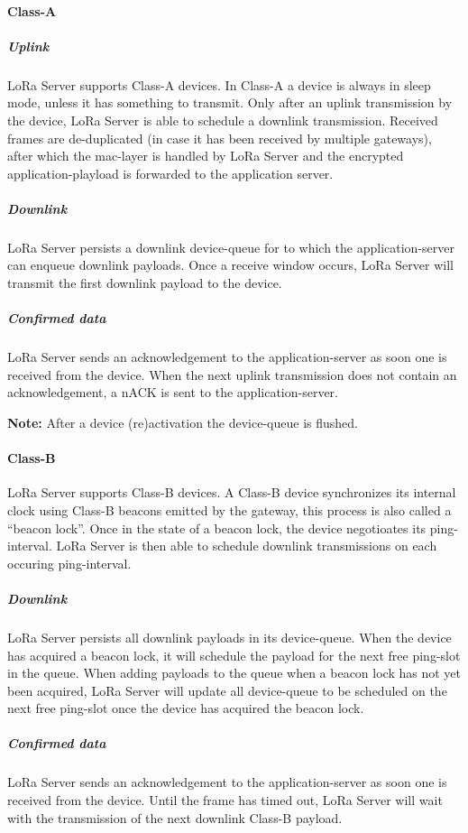 \paragraph{Class-A}

\subparagraph{Uplink}
LoRa Server supports Class-A devices.
In Class-A a device is always in sleep mode,
	unless it has something to transmit.
Only after an uplink transmission by the device,
	LoRa Server is able to schedule a downlink transmission.
Received frames are de-duplicated (in case it has been received by multiple gateways),
	after which the mac-layer is handled by LoRa Server and the encrypted application-playload is forwarded to the application server.

\subparagraph{Downlink}
LoRa Server persists a downlink device-queue for to which the application-server can enqueue downlink payloads.
Once a receive window occurs,
	LoRa Server will transmit the first downlink payload to the device.

\subparagraph{Confirmed data}
LoRa Server sends an acknowledgement to the application-server as soon one is received from the device.
When the next uplink transmission does not contain an acknowledgement,
	a nACK is sent to the application-server.

\textbf{Note:}
	After a device (re)activation the device-queue is flushed.




\paragraph{Class-B}
LoRa Server supports Class-B devices.
A Class-B device synchronizes its internal clock using Class-B beacons emitted by the gateway,
	this process is also called a “beacon lock”.
Once in the state of a beacon lock,
	the device negotioates its ping-interval.
LoRa Server is then able to schedule downlink transmissions on each occuring ping-interval.

\subparagraph{Downlink}
LoRa Server persists all downlink payloads in its device-queue.
When the device has acquired a beacon lock,
	it will schedule the payload for the next free ping-slot in the queue.
When adding payloads to the queue when a beacon lock has not yet been acquired,
	LoRa Server will update all device-queue to be scheduled on the next free ping-slot once the device has acquired the beacon lock.

\subparagraph{Confirmed data}
LoRa Server sends an acknowledgement to the application-server as soon one is received from the device.
Until the frame has timed out,
	LoRa Server will wait with the transmission of the next downlink Class-B payload.

